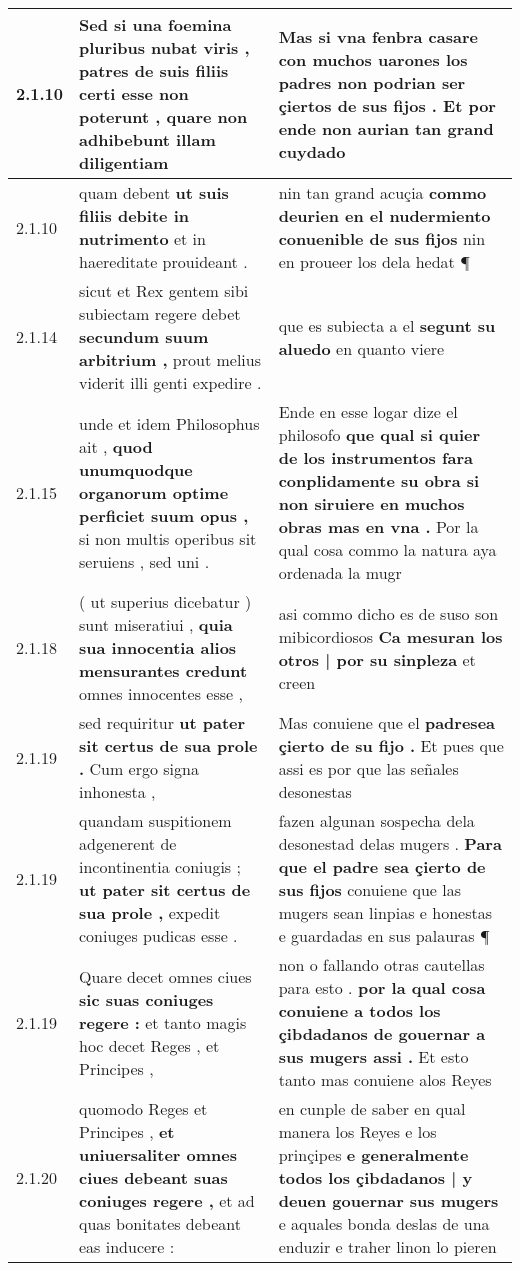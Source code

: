 \begin{tabular}{|p{1cm}|p{6.5cm}|p{6.5cm}|}
2.1.10 & Sed si una foemina pluribus nubat viris , \textbf{ patres de suis filiis certi esse non poterunt , } quare non adhibebunt illam diligentiam & Mas si vna fenbra casare con muchos uarones \textbf{ los padres non podrian ser çiertos de sus fijos . } Et por ende non aurian tan grand cuydado \\\hline
2.1.10 & quam debent \textbf{ ut suis filiis debite in nutrimento } et in haereditate prouideant . & nin tan grand acuçia \textbf{ commo deurien en el nudermiento conuenible de sus fijos } nin en proueer los dela hedat ¶ \\\hline
2.1.14 & sicut et Rex gentem sibi subiectam regere debet \textbf{ secundum suum arbitrium , } prout melius viderit illi genti expedire . & que es subiecta a el \textbf{ segunt su aluedo } en quanto viere \\\hline
2.1.15 & unde et idem Philosophus ait , \textbf{ quod unumquodque organorum optime perficiet suum opus , } si non multis operibus sit seruiens , sed uni . & Ende en esse logar dize el philosofo \textbf{ que qual si quier de los instrumentos fara conplidamente su obra si non siruiere en muchos obras mas en vna . } Por la qual cosa commo la natura aya ordenada la mugr \\\hline
2.1.18 & ( ut superius dicebatur ) sunt miseratiui , \textbf{ quia sua innocentia alios mensurantes credunt } omnes innocentes esse , & asi commo dicho es de suso son mibicordiosos \textbf{ Ca mesuran los otros | por su sinpleza } et creen \\\hline
2.1.19 & sed requiritur \textbf{ ut pater sit certus de sua prole . } Cum ergo signa inhonesta , & Mas conuiene que el \textbf{ padresea çierto de su fijo . } Et pues que assi es por que las señales desonestas \\\hline
2.1.19 & quandam suspitionem adgenerent de incontinentia coniugis ; \textbf{ ut pater sit certus de sua prole , } expedit coniuges pudicas esse . & fazen algunan sospecha dela desonestad delas mugers . \textbf{ Para que el padre sea çierto de sus fijos } conuiene que las mugers sean linpias e honestas e guardadas en sus palauras ¶ \\\hline
2.1.19 & Quare decet omnes ciues \textbf{ sic suas coniuges regere : } et tanto magis hoc decet Reges , et Principes , & non o fallando otras cautellas para esto . \textbf{ por la qual cosa conuiene a todos los çibdadanos de gouernar a sus mugers assi . } Et esto tanto mas conuiene alos Reyes \\\hline
2.1.20 & quomodo Reges et Principes , \textbf{ et uniuersaliter omnes ciues debeant suas coniuges regere , } et ad quas bonitates debeant eas inducere : & en cunple de saber en qual manera los Reyes e los prinçipes \textbf{ e generalmente todos los çibdadanos | y deuen gouernar sus mugers } e aquales bonda deslas de una enduzir e traher linon lo pieren \\\hline

\end{tabular}
